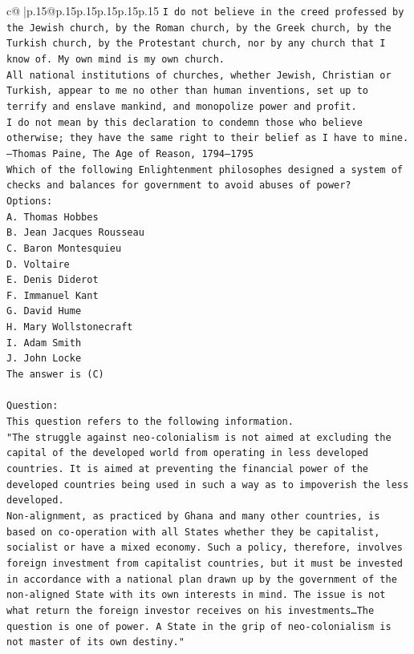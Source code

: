 \documentclass{article}
\begin{document}
{\begin{supertabular}{c@{$\;$}|p{.15\linewidth}@{}p{.15\linewidth}p{.15\linewidth}p{.15\linewidth}p{.15\linewidth}p{.15\linewidth}}
{{{\texttt{I do not believe in the creed professed by the Jewish church, by the Roman church, by the Greek church, by the Turkish church, by the Protestant church, nor by any church that I know of. My own mind is my own church.} \\
\texttt{All national institutions of churches, whether Jewish, Christian or Turkish, appear to me no other than human inventions, set up to terrify and enslave mankind, and monopolize power and profit.} \\
\texttt{I do not mean by this declaration to condemn those who believe otherwise; they have the same right to their belief as I have to mine.} \\
\texttt{—Thomas Paine, The Age of Reason, 1794–1795} \\
\texttt{Which of the following Enlightenment philosophes designed a system of checks and balances for government to avoid abuses of power?} \\
\texttt{Options:} \\
\texttt{A. Thomas Hobbes} \\
\texttt{B. Jean Jacques Rousseau} \\
\texttt{C. Baron Montesquieu} \\
\texttt{D. Voltaire} \\
\texttt{E. Denis Diderot} \\
\texttt{F. Immanuel Kant} \\
\texttt{G. David Hume} \\
\texttt{H. Mary Wollstonecraft} \\
\texttt{I. Adam Smith} \\
\texttt{J. John Locke} \\
\texttt{The answer is (C)} \\
\\ 
\texttt{Question:} \\
\texttt{This question refers to the following information.} \\
\texttt{"The struggle against neo{-}colonialism is not aimed at excluding the capital of the developed world from operating in less developed countries. It is aimed at preventing the financial power of the developed countries being used in such a way as to impoverish the less developed.} \\
\texttt{Non{-}alignment, as practiced by Ghana and many other countries, is based on co{-}operation with all States whether they be capitalist, socialist or have a mixed economy. Such a policy, therefore, involves foreign investment from capitalist countries, but it must be invested in accordance with a national plan drawn up by the government of the non{-}aligned State with its own interests in mind. The issue is not what return the foreign investor receives on his investments…The question is one of power. A State in the grip of neo{-}colonialism is not master of its own destiny."} \\
}}}
\end{supertabular}}
\end{document}
